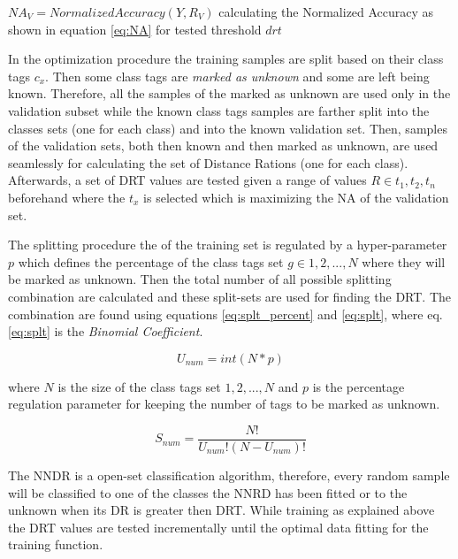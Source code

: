 \begin{algorithm}[H]
{{    }

    $NA_{V} = NormalizedAccuracy(Y, R_{V})$ calculating the Normalized Accuracy as shown in equation \ref{eq:NA} for tested threshold $drt$\;


}

\end{algorithm}

In the optimization procedure the training samples are split based on their class tags $c_{x}$. Then some class tags are \textit{marked as unknown} and some are left being known. Therefore, all the samples of the marked as unknown are used only in the validation subset while the known class tags samples are farther split into the classes sets (one for each class) and into the known validation set. Then, samples of the validation sets, both then known and then marked as unknown, are used seamlessly for calculating the set of Distance Rations (one for each class). Afterwards, a set of DRT values are tested given a range of values $R \in {t_{1}, t_{2}, t_{n}}$ beforehand where the $t_{x}$ is selected which is maximizing the NA of the validation set.

The splitting procedure the of the training set is regulated by a hyper-parameter $p$ which defines the percentage of the class tags set $g \in {1,2,...,N}$ where they will be marked as unknown. Then the total number of all possible splitting combination are calculated and these split-sets are used for finding the DRT. The combination are found using equations \ref{eq:splt_percent} and \ref{eq:splt}, where eq.\ref{eq:splt} is the \textit{Binomial Coefficient}.

\begin{equation} \label{eq:splt_percent}
    U_{num} = int(N * p)
\end{equation}

\noindent
where $N$ is the size of the class tags set ${1,2,...,N}$ and $p$ is the percentage regulation parameter for keeping the number of tags to be marked as unknown.

\begin{equation} \label{eq:splt}
    S_{num} = \frac{N!}{U_{num}!(N-U_{num})!}
\end{equation}

The NNDR is a open-set classification algorithm, therefore, every random sample will be classified to one of the classes the NNRD has been fitted or to the unknown when its DR is greater then DRT. While training as explained above the DRT values are tested incrementally until the optimal data fitting for the training function.


